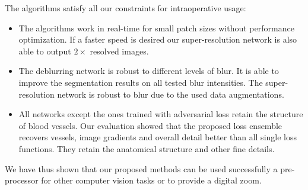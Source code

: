 \documentclass{scrartcl}
\begin{document}
The algorithms satisfy all our constraints for intraoperative usage:
\begin{itemize}
\item The algorithms work in real-time for small patch sizes without performance optimization.
  If a faster speed is desired our super-resolution network is also able to output $2\times$ resolved images.
\item The deblurring network is robust to different levels of blur.
  It is able to improve the segmentation results on all tested blur intensities.
  The super-resolution network is robust to blur due to the used data augmentations.
\item All networks except the ones trained with adversarial loss retain the structure of blood vessels.
  Our evaluation showed that the proposed loss ensemble recovers vessels, image gradients and overall detail better than all single loss functions.
  They retain the anatomical structure and other fine details.
\end{itemize}
We have thus shown that our proposed methods can be used successfully a pre-processor for other computer vision tasks or to provide a digital zoom.

\FloatBarrier
\printbibliography
\end{document}
